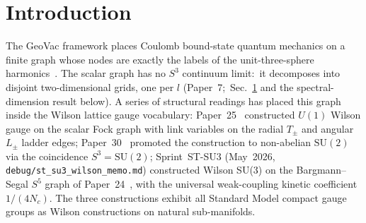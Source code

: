 \documentclass[11pt]{article}
\begin{document}
\begin{abstract}
compact $U(1)$.  (vi) Full-MC Wilson loops: the ensemble-mean string tension
is positive and decreasing, but a joint area-plus-perimeter fit gives an
area coefficient consistent with zero (the cleanest fixed-$L = 6$ datum,
$\sigma = -0.004 \pm 0.003$), the signal being carried by the perimeter term;
an earlier resolution of the Polyakov-rate mismatch rested on a figure,
$5\times 10^{-9}$, that is the extrapolated monopole density, not the string
tension, and is withdrawn.  (vii) On the product graph $G_B \times C_{N_t}$
the Polyakov-loop class is the one extra first-cohomology class (checked at
$n_\text{max} = 2$); but $\langle P\rangle = 0$, the quantity reported, is
forced by centre symmetry in finite volume at every $\beta$ and so carries no
confinement information, while the diagnostic quantity
$\langle |P_\text{lat}| \rangle$ rises from the random-phase value $0.285$ to
$0.833$ at $\beta = 3$, $N_t = 4$.  The confinement reading of (vii) is
therefore withdrawn.  Honest scope: $n_\text{max} \in \{2,3,4\}$ and
finite-$\beta$ Monte Carlo give sprint-level resolution, not
thermodynamic-limit physics.
\end{abstract}

\section{Introduction}
\label{sec:intro}

The GeoVac framework places Coulomb bound-state quantum mechanics on a
finite graph whose nodes are exactly the labels of the unit-three-sphere
harmonics~\cite{paper7}.  The scalar graph has no $S^3$ continuum limit:\ it
decomposes into disjoint two-dimensional grids, one per $l$ (Paper~7;\
Sec.~\ref{sec:intro} and the spectral-dimension result below).
A series of structural readings has placed this graph inside the Wilson lattice
gauge vocabulary: Paper~25~\cite{paper25} constructed $U(1)$ Wilson gauge on the
scalar Fock graph with link variables on the radial $T_\pm$ and angular $L_\pm$
ladder edges; Paper~30~\cite{paper30} promoted the construction to non-abelian
$\mathrm{SU}(2)$ via the coincidence $S^3=\mathrm{SU}(2)$; Sprint~ST-SU3
(May~2026, \texttt{debug/st\_su3\_wilson\_memo.md}) constructed Wilson SU(3) on
the Bargmann--Segal $S^5$ graph of Paper~24~\cite{paper24}, with the universal
weak-coupling kinetic coefficient $1/(4 N_c)$. The three constructions exhibit all
Standard Model compact gauge groups as Wilson constructions on natural
sub-manifolds.
\end{document}
